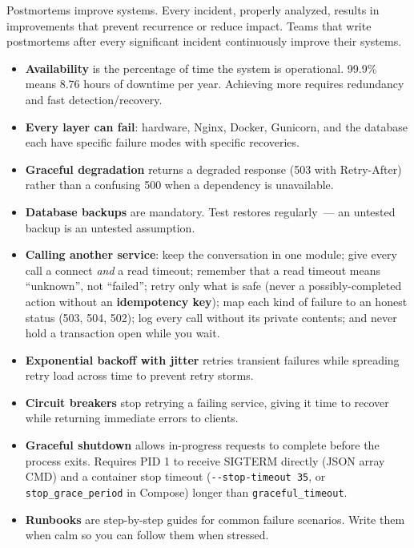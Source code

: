 \noindent{}Postmortems improve systems. Every incident, properly analyzed, results in improvements that prevent recurrence or reduce impact. Teams that write postmortems after every significant incident continuously improve their systems.

\label{37-reliability:key-takeaways}
\begin{takeaways}

\begin{itemize}
\tightlist
\item
  \textbf{Availability} is the percentage of time the system is operational. 99.9\% means 8.76 hours of downtime per year. Achieving more requires redundancy and fast detection/recovery.
\item
  \textbf{Every layer can fail}: hardware, Nginx, Docker, Gunicorn, and the database each have specific failure modes with specific recoveries.
\item
  \textbf{Graceful degradation} returns a degraded response (503 with Retry-After) rather than a confusing 500 when a dependency is unavailable.
\item
  \textbf{Database backups} are mandatory. Test restores regularly~--- an untested backup is an untested assumption.
\item
  \textbf{Calling another service}: keep the conversation in one module; give every call a connect \emph{and} a read timeout; remember that a read timeout means ``unknown'', not ``failed''; retry only what is safe (never a possibly-completed action without an \textbf{idempotency key}); map each kind of failure to an honest status (503, 504, 502); log every call without its private contents; and never hold a transaction open while you wait.
\item
  \textbf{Exponential backoff with jitter} retries transient failures while spreading retry load across time to prevent retry storms.
\item
  \textbf{Circuit breakers} stop retrying a failing service, giving it time to recover while returning immediate errors to clients.
\item
  \textbf{Graceful shutdown} allows in-progress requests to complete before the process exits. Requires PID 1 to receive SIGTERM directly (JSON array CMD) and a container stop timeout (\texttt{-\/-stop-timeout\ 35}, or \texttt{stop\_grace\_period} in Compose) longer than \texttt{graceful\_timeout}.
\item
  \textbf{Runbooks} are step-by-step guides for common failure scenarios. Write them when calm so you can follow them when stressed.

\end{itemize}
\end{takeaways}

